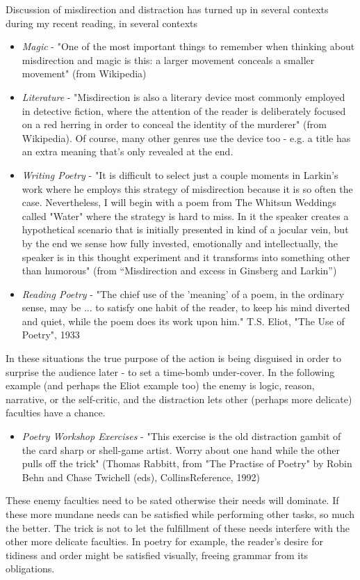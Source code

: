 \documentclass[11pt]{article}
\begin{document}
Discussion of misdirection and distraction has turned up in several contexts during my recent reading, in several contexts
\begin{itemize}
\item \textit{Magic} - "One of the most important things to remember when thinking about misdirection and magic is this: a larger movement conceals a smaller movement" (from Wikipedia)
    \item \textit{Literature} - "Misdirection is also a literary device most commonly employed in detective fiction, where the attention of the reader is deliberately focused on a red herring in order to conceal the identity of the murderer" (from Wikipedia). Of course, many other genres use the device too - e.g. a title has an extra meaning that's only revealed at the end.
    \item \textit{Writing Poetry} - "It is difficult to select just a couple moments in Larkin's work where he employs this strategy of misdirection because it is so often the case. Nevertheless, I will begin with a poem from The Whitsun Weddings called "Water" where the strategy is hard to miss. In it the speaker creates a hypothetical scenario that is initially presented in kind of a jocular vein, but by the end we sense how fully invested, emotionally and intellectually, the speaker is in this thought experiment and it transforms into something other than humorous" (from ``Misdirection and excess in Ginsberg and Larkin'')
    \item \textit{Reading Poetry} - "The chief use of the 'meaning' of a poem, in the ordinary sense, may be ... to satisfy one habit of the reader, to keep his mind diverted and quiet, while the poem does its work upon him." T.S. Eliot, "The Use of Poetry", 1933
\end{itemize}
In these situations the true purpose of the action is being disguised in order to surprise the audience later - to set a time-bomb under-cover. In the following example (and perhaps the Eliot example too) the enemy is logic, reason, narrative, or the self-critic, and the distraction lets other (perhaps more delicate) faculties have a chance.
\begin{itemize}
    \item \textit{Poetry Workshop Exercises} - "This exercise is the old distraction gambit of the card sharp or shell-game artist. Worry about one hand while the other pulls off the trick" (Thomas Rabbitt, from "The Practise of Poetry" by Robin Behn and Chase Twichell (eds), CollinsReference, 1992)
\end{itemize}
These enemy faculties need to be sated otherwise their needs will dominate. If these more mundane needs can be satisfied while performing other tasks, so much the better. The trick is not to let the fulfillment of these needs interfere with the other more delicate faculties. In poetry for example, the reader's desire for tidiness and order might be satisfied visually, freeing grammar from its obligations.
\end{document}

